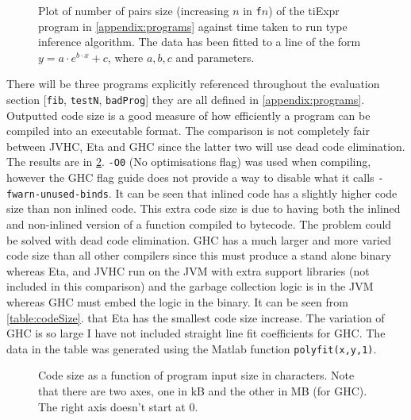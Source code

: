 \documentclass[float=false, crop=false]{standalone}
\newlength\gwidth
\newlength\gheight
\newcommand{\importMGraph}[3]{\setlength{\gwidth}{#2}\setlength{\gheight}{#3}{#1}}
\begin{document}
\begin{figure}
  \begin{samepage}
  \importMGraph{tiTime.tex}{0.93\textwidth}{0.4\textwidth}
  \caption[Type inference runtime as a function of input size]
  {Plot of number of pairs size (increasing $n$ in \texttt{f$n$}) 
    of the tiExpr program in \cref{appendix:programs} against time taken 
    to run type inference algorithm. The data has been fitted to a line of the form
    $y = a \cdot e^{b\cdot x}+c$, where $a,b,c$ and parameters.}
  \label{plot:tiTime}
\end{samepage}
\end{figure}
There will be three programs explicitly referenced throughout the evaluation section 
[\texttt{fib}, \texttt{testN}, \texttt{badProg}] they are all defined in 
\cref{appendix:programs}.
Outputted code size is a good measure of how efficiently a program can be compiled into an executable format. 
The comparison is not completely fair between JVHC, Eta and GHC 
since the latter two will use dead code elimination. 
The results are in \cref{plot:codeSize}. \texttt{-O0} (No optimisations flag) 
was used when compiling, however the GHC flag guide \cite{haskell-flag-ref}
does not provide a way to disable what it calls \texttt{-fwarn-unused-binds}.
It can be seen that inlined code has a slightly higher code size than non inlined code. This extra code size is due to having both the inlined and 
non-inlined version of a function compiled to bytecode. 
The problem could be solved with dead code elimination. GHC has a much larger 
and more varied code size than all other compilers since this must produce a stand alone binary 
whereas Eta, and JVHC run on the JVM with extra support libraries (not included in this comparison) 
and the garbage collection logic is in the JVM whereas GHC must embed the logic in the binary. 
It can be seen from \cref{table:codeSize}. 
that Eta has the smallest code size increase. The variation of GHC is so large I have not
included straight line fit coefficients for GHC. The data in the table
was generated using the Matlab function \verb|polyfit(x,y,1)|.


\begin{figure}
  \centering 
  \importMGraph{plotCodeSize.tex}{0.90\textwidth}{0.4\textwidth}
  \caption[Code size as a function of program input size in characters]
          {Code size as a function of program input size in characters. Note that 
           there are two axes, one in kB and the other in MB (for GHC). The right axis 
           doesn't start at 0.}
  \label{plot:codeSize}
\end{figure}
\end{document}
